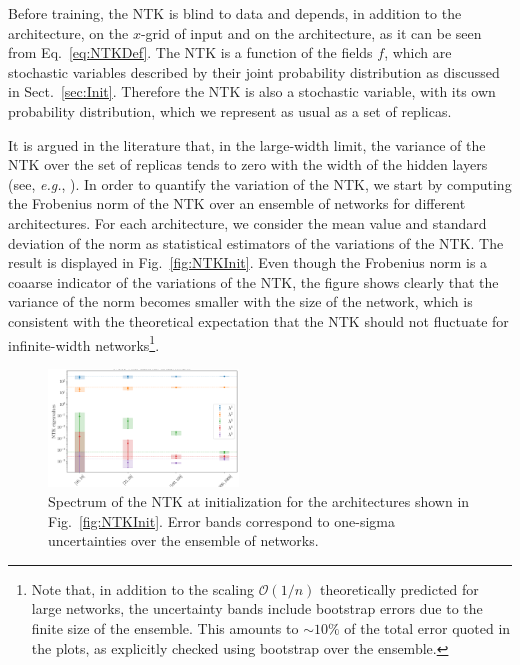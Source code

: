 Before training, the NTK is blind to data and depends, in addition to the
architecture, on the $x$-grid of input and on the architecture, as it can be
seen from Eq.~\eqref{eq:NTKDef}. The NTK is a function of the fields $f$, which
are stochastic variables described by their joint probability distribution as
discussed in Sect.~\ref{sec:Init}. Therefore the NTK is also a stochastic
variable, with its own probability distribution, which we represent as usual as
a set of replicas. 

It is argued in the literature that, in the large-width
limit, the variance of the NTK over the set of replicas tends to zero with the
width of the hidden layers (see, \textit{e.g.}, \cite{Roberts:2021fes}). In
order to quantify the variation of the NTK, we start by computing the Frobenius
norm of the NTK over an ensemble of networks for different architectures. For
each architecture, we consider the mean value and standard deviation of the norm
as statistical estimators of the variations of the NTK. The result is displayed
in Fig.~\ref{fig:NTKInit}. Even though the Frobenius norm is a coaarse indicator
of the variations of the NTK, the figure shows clearly that the variance of the
norm becomes smaller with the size of the network, which is consistent with the
theoretical expectation that the NTK should not fluctuate for infinite-width
networks\footnote{Note that, in addition to the scaling $\mathcal{O}(1/n)$ theoretically
predicted for large networks, the uncertainty bands include bootstrap errors due
to the finite size of the ensemble. This amounts to $\sim 10\%$ of the total error
quoted in the plots, as explicitly checked using bootstrap over the ensemble.}.

\begin{figure}[t]
  \centering
  \includegraphics[width=0.45\textwidth]{figs/section_3/ntk_initialization_arch.pdf}
  \caption{Spectrum of the NTK at initialization for the architectures shown in
  Fig.~\ref{fig:NTKInit}. Error bands correspond to one-sigma uncertainties over
  the ensemble of networks.}
  \label{fig:NTKSpectrum}
\end{figure}

